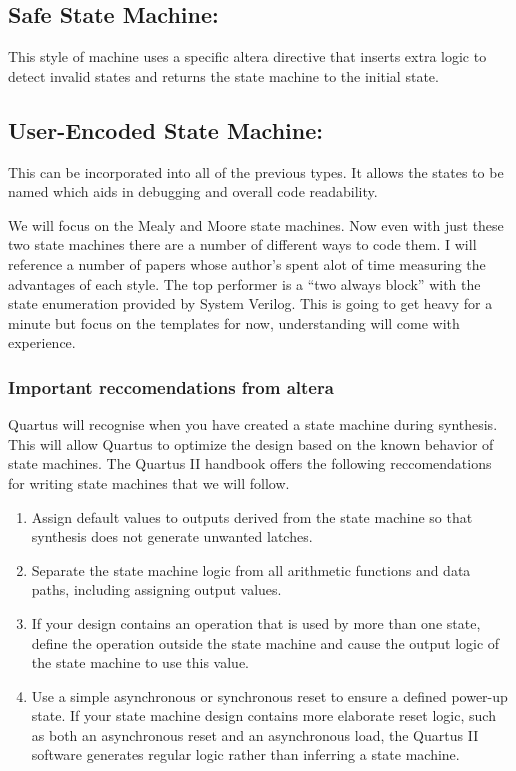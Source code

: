       \subsection{Safe State Machine:} This style of machine uses a specific altera directive that inserts extra logic to detect invalid states and returns the state machine to the initial state.
      
      \subsection{User-Encoded State Machine:} This can be incorporated into all of the previous types. It allows the states to be named which aids in debugging and overall code readability.

      We will focus on the Mealy and Moore state machines. Now even with just these two state machines there are a number of different ways to code them. I will reference a number of papers whose author's spent alot of time measuring the advantages of each style. The top performer is a ``two always block'' with the state enumeration provided by System Verilog. This is going to get heavy for a minute but focus on the templates for now, understanding will come with experience.

    \subsubsection{Important reccomendations from altera}
      Quartus will recognise when you have created a state machine during synthesis. This will allow Quartus to optimize the design based on the known behavior of state machines. The Quartus II handbook offers the following reccomendations for writing state machines that we will follow.
      \begin{enumerate}
        \item Assign default values to outputs derived from the state machine so that synthesis does not generate unwanted latches.
        \item Separate the state machine logic from all arithmetic functions and data paths, including assigning output values.
        \item If your design contains an operation that is used by more than one state, define the operation outside the state machine and cause the output logic of the state machine to use this value.
        \item Use a simple asynchronous or synchronous reset to ensure a defined power-up state. If your state machine design contains more elaborate reset logic, such as both an asynchronous reset and an asynchronous load, the Quartus II software generates regular logic rather than inferring a state machine.
      \end{enumerate}

